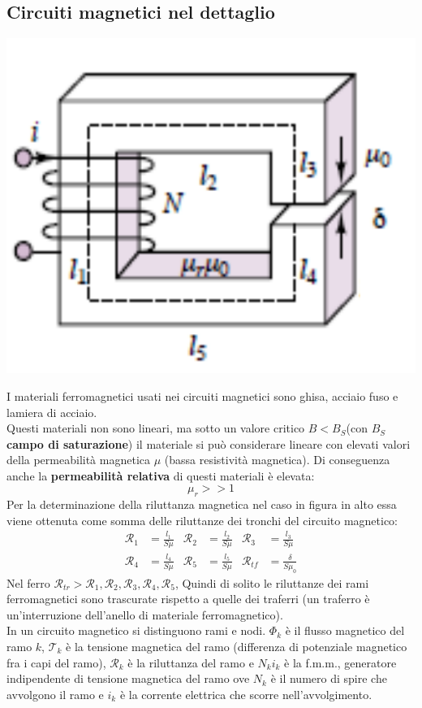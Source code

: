 \documentclass{article}
\begin{document}
\subsection{Circuiti magnetici nel dettaglio}
\begin{center}
    \includegraphics[scale=0.27]{Image/Circuiti_magnetici_dettaglio_1.png}
\end{center}
I materiali ferromagnetici usati nei circuiti magnetici sono ghisa, acciaio fuso e lamiera di acciaio.\\
Questi materiali non sono lineari, ma sotto un valore critico $B <B_S$(con $B_S$ \textbf{campo di saturazione}) il materiale si può considerare lineare con elevati valori della permeabilità magnetica $\mu$ (bassa resistività magnetica). Di conseguenza anche la \textbf{permeabilità relativa} di questi materiali è elevata:
\[
    \mu_r >>1
\]
Per la determinazione della riluttanza magnetica nel caso in figura in alto essa viene ottenuta come somma delle riluttanze dei tronchi del circuito magnetico:
\begin{align*}
    \mathcal{R}_1 &= \frac{l_1}{S \mu} & \mathcal{R}_2 &= \frac{l_2}{S \mu} & \mathcal{R}_3 &= \frac{l_3}{S \mu}
    \\
    \mathcal{R}_4 &= \frac{l_4}{S \mu} &
    \mathcal{R}_5 &= \frac{l_5}{S \mu} &
    \mathcal{R}_{tf} &= \frac{\delta}{S \mu_0}
\end{align*}
Nel ferro $\mathcal{R}_{tr}>\mathcal{R}_1,\mathcal{R}_2,\mathcal{R}_3,\mathcal{R}_4,\mathcal{R}_5$, Quindi di solito le riluttanze dei rami ferromagnetici sono trascurate rispetto a quelle dei traferri (un traferro è un'interruzione dell'anello di materiale ferromagnetico).
\vspace*{0.2cm}\\
In un circuito magnetico si distinguono rami e nodi. $\Phi_k$ è il flusso magnetico del
ramo $k$, $\mathcal{T}_k$ è la tensione magnetica del ramo (differenza di potenziale magnetico fra i capi del ramo), $\mathcal{R}_k$ è la riluttanza del ramo e $N_ki_k$ è la f.m.m., generatore indipendente di tensione magnetica del ramo ove $N_k$ è il numero di spire che avvolgono il ramo e $i_k$ è la corrente elettrica che scorre nell'avvolgimento.
\end{document}
